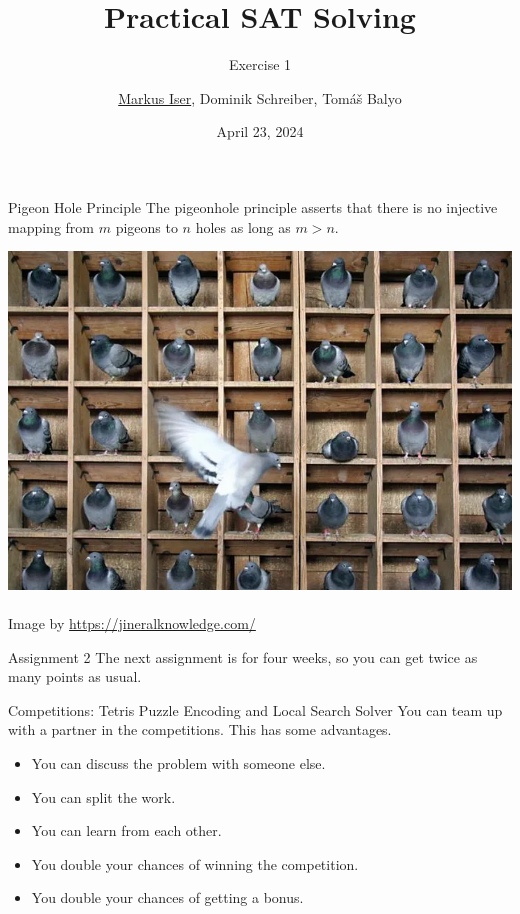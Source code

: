 \documentclass[t]{sdqbeamer}
\title[SAT Solving]{Practical SAT Solving}
\subtitle{Exercise 1}
\author{\underline{Markus Iser}, Dominik Schreiber, Tom\'a\v{s} Balyo}
\date{April 23, 2024}
\begin{document}
\begin{frame}
	\thispagestyle{empty}
	\titlepage
\end{frame}

\begin{frame}{Pigeon Hole Principle}
	The pigeonhole principle asserts that there is no injective mapping from $m$ pigeons to $n$ holes as long as $m > n$.
	\begin{center}
		\includegraphics[height=0.6\textheight]{figures/e01/phole.png}~\\
		Image by \url{https://jineralknowledge.com/}
	\end{center}
\end{frame}

\begin{frame}{Assignment 2}
	The next assignment is for four weeks, so you can get twice as many points as usual.
	\begin{block}{Competitions: Tetris Puzzle Encoding and Local Search Solver}
		You can team up with a partner in the competitions. This has some advantages.~\\[1ex]
		\begin{itemize}\setlength{\itemsep}{1ex}
			\item You can discuss the problem with someone else.
			\item You can split the work.
			\item You can learn from each other.
			\item You double your chances of winning the competition.
			\item You double your chances of getting a bonus.
		\end{itemize}
	\end{block}
\end{frame}
\end{document}
